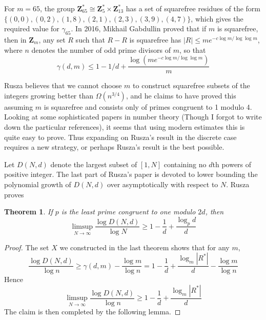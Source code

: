 \documentclass{report}
\theoremstyle{plain}
\theoremstyle{plain}
\newtheorem{theorem}{Theorem}
\begin{document}
For $m = 65$, the group $\mathbf{Z}_{65}^* \cong \mathbf{Z}_{5}^* \times \mathbf{Z}_{13}^*$ has a set of squarefree residues of the form $\{ (0,0), (0,2), (1,8), (2,1), (2,3), (3,9), (4,7) \}$, which gives the required value for $\gamma_{65}$. In 2016, Mikhail Gabdullin proved that if $m$ is squarefree, then in $\mathbf{Z}_m$, any set $R$ such that $R - R$ is squarefree has $|R| \leq me^{-c \log m / \log \log m}$, where $n$ denotes the number of odd prime divisors of $m$, so that
%
\[ \gamma(d,m) \leq 1 - 1/d + \frac{\log(me^{-c \log m / \log \log m})}{m} \]

Rusza believes that we cannot choose $m$ to construct squarefree subsets of the integers growing better than $\Omega(n^{3/4})$, and he claims to have proved this assuming $m$ is squarefree and consists only of primes congruent to 1 modulo 4. Looking at some sophisticated papers in number theory (Though I forgot to write down the particular references), it seems that using modern estimates this is quite easy to prove. Thus expanding on Rusza's result in the discrete case requires a new strategy, or perhaps Rusza's result is the best possible.

Let $D(N,d)$ denote the largest subset of $[1,N]$ containing no $d$th powers of positive integer. The last part of Rusza's paper is devoted to lower bounding the polynomial growth of $D(N,d)$ over asymptotically with respect to $N$. Rusza proves

\begin{theorem}
    If $p$ is the least prime congruent to one modulo $2d$, then
    \[ \limsup_{N \to \infty} \frac{\log D(N,d)}{\log N} \geq 1 - \frac{1}{d} + \frac{\log_p d}{d} \]
\end{theorem}
\begin{proof}
    The set $X$ we constructed in the last theorem shows that for any $m$,
    \[ \frac{\log D(N,d)}{\log n} \geq \gamma(d,m) - \frac{\log m}{\log n} = 1 - \frac{1}{d} + \frac{\log_m |R^*|}{d} - \frac{\log m}{\log n} \]
    Hence
    \[ \limsup_{N \to \infty} \frac{\log D(N,d)}{\log n} \geq 1 - \frac{1}{d} + \frac{\log_m |R^*|}{d} \]
    The claim is then completed by the following lemma.
\end{proof}
\end{document}
